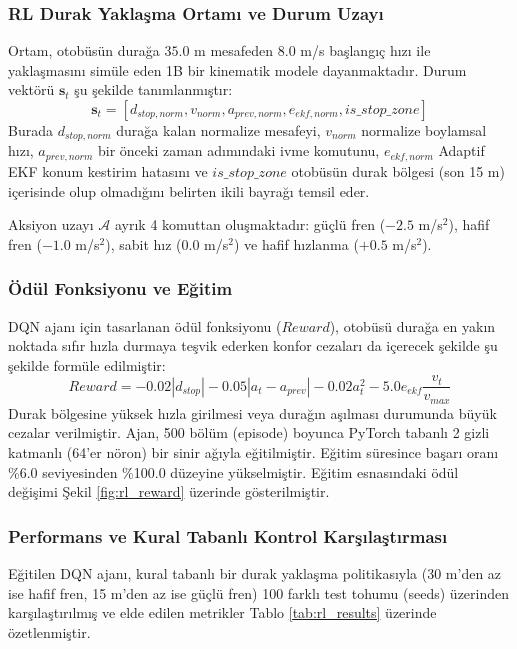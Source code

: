 ﻿\documentclass[conference]{IEEEtran}
\begin{document}
\subsubsection{RL Durak Yaklaşma Ortamı ve Durum Uzayı}
Ortam, otobüsün durağa $35.0$ m mesafeden $8.0$ m/s başlangıç hızı ile yaklaşmasını simüle eden 1B bir kinematik modele dayanmaktadır. Durum vektörü $\mathbf{s}_t$ şu şekilde tanımlanmıştır:
\begin{equation}
\mathbf{s}_t = [d_{stop, norm}, v_{norm}, a_{prev, norm}, e_{ekf, norm}, is\_stop\_zone]
\end{equation}
Burada $d_{stop, norm}$ durağa kalan normalize mesafeyi, $v_{norm}$ normalize boylamsal hızı, $a_{prev, norm}$ bir önceki zaman adımındaki ivme komutunu, $e_{ekf, norm}$ Adaptif EKF konum kestirim hatasını ve $is\_stop\_zone$ otobüsün durak bölgesi (son 15 m) içerisinde olup olmadığını belirten ikili bayrağı temsil eder.

Aksiyon uzayı $\mathcal{A}$ ayrık 4 komuttan oluşmaktadır: güçlü fren ($-2.5$ m/s$^2$), hafif fren ($-1.0$ m/s$^2$), sabit hız ($0.0$ m/s$^2$) ve hafif hızlanma ($+0.5$ m/s$^2$).

\subsubsection{Ödül Fonksiyonu ve Eğitim}
DQN ajanı için tasarlanan ödül fonksiyonu ($Reward$), otobüsü durağa en yakın noktada sıfır hızla durmaya teşvik ederken konfor cezaları da içerecek şekilde şu şekilde formüle edilmiştir:
\begin{equation}
Reward = -0.02 |d_{stop}| - 0.05 |a_t - a_{prev}| - 0.02 a_t^2 - 5.0 e_{ekf} \frac{v_t}{v_{max}}
\end{equation}
Durak bölgesine yüksek hızla girilmesi veya durağın aşılması durumunda büyük cezalar verilmiştir. Ajan, 500 bölüm (episode) boyunca PyTorch tabanlı 2 gizli katmanlı (64'er nöron) bir sinir ağıyla eğitilmiştir. Eğitim süresince başarı oranı \%6.0 seviyesinden \%100.0 düzeyine yükselmiştir. Eğitim esnasındaki ödül değişimi Şekil \ref{fig:rl_reward} üzerinde gösterilmiştir.

\subsubsection{Performans ve Kural Tabanlı Kontrol Karşılaştırması}
Eğitilen DQN ajanı, kural tabanlı bir durak yaklaşma politikasıyla (30 m'den az ise hafif fren, 15 m'den az ise güçlü fren) 100 farklı test tohumu (seeds) üzerinden karşılaştırılmış ve elde edilen metrikler Tablo \ref{tab:rl_results} üzerinde özetlenmiştir.
\end{document}
